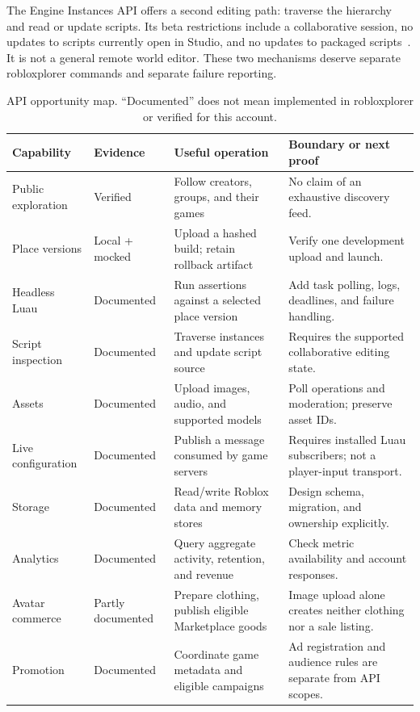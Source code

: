 \documentclass[10pt,letterpaper,twocolumn]{article}
\begin{document}
The Engine Instances API offers a second editing path: traverse the hierarchy and read or update scripts. Its beta restrictions include a collaborative session, no updates to scripts currently open in Studio, and no updates to packaged scripts~\cite{instances}. It is not a general remote world editor. These two mechanisms deserve separate robloxplorer commands and separate failure reporting.

\begin{table}[t]
\centering\small
\caption{API opportunity map. ``Documented'' does not mean implemented in robloxplorer or verified for this account.}
\label{tab:capabilities}
\begin{tabularx}{\textwidth}{@{}p{}p{}YY@{}}
\toprule
Capability & Evidence & Useful operation & Boundary or next proof \\
\midrule
Public exploration & Verified & Follow creators, groups, and their games & No claim of an exhaustive discovery feed. \\
Place versions & Local + mocked & Upload a hashed build; retain rollback artifact & Verify one development upload and launch. \\
Headless Luau & Documented & Run assertions against a selected place version & Add task polling, logs, deadlines, and failure handling. \\
Script inspection & Documented & Traverse instances and update script source & Requires the supported collaborative editing state. \\
Assets & Documented & Upload images, audio, and supported models & Poll operations and moderation; preserve asset IDs. \\
Live configuration & Documented & Publish a message consumed by game servers & Requires installed Luau subscribers; not a player-input transport. \\
Storage & Documented & Read/write Roblox data and memory stores & Design schema, migration, and ownership explicitly. \\
Analytics & Documented & Query aggregate activity, retention, and revenue & Check metric availability and account responses. \\
Avatar commerce & Partly documented & Prepare clothing, publish eligible Marketplace goods & Image upload alone creates neither clothing nor a sale listing. \\
Promotion & Documented & Coordinate game metadata and eligible campaigns & Ad registration and audience rules are separate from API scopes. \\
\bottomrule
\end{tabularx}
\end{table}
\end{document}
